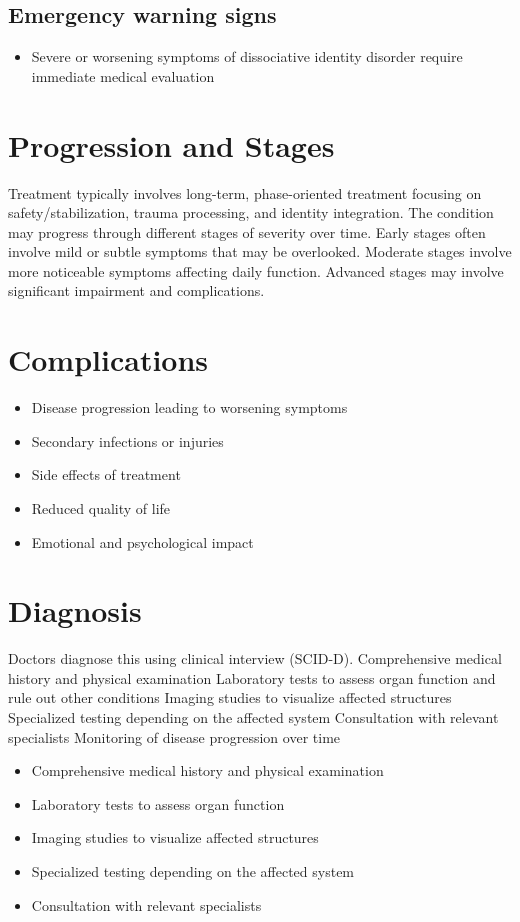 \subsection{Emergency warning signs}
\begin{itemize}[noitemsep]
  \item Severe or worsening symptoms of dissociative identity disorder require immediate medical evaluation
\end{itemize}
\section{Progression and Stages}
Treatment typically involves long-term, phase-oriented treatment focusing on safety/stabilization, trauma processing, and identity integration. The condition may progress through different stages of severity over time. Early stages often involve mild or subtle symptoms that may be overlooked. Moderate stages involve more noticeable symptoms affecting daily function. Advanced stages may involve significant impairment and complications.
\section{Complications}
\begin{itemize}[noitemsep]
  \item Disease progression leading to worsening symptoms
  \item Secondary infections or injuries
  \item Side effects of treatment
  \item Reduced quality of life
  \item Emotional and psychological impact
\end{itemize}
\section{Diagnosis}
Doctors diagnose this using clinical interview (SCID-D). Comprehensive medical history and physical examination Laboratory tests to assess organ function and rule out other conditions Imaging studies to visualize affected structures Specialized testing depending on the affected system Consultation with relevant specialists Monitoring of disease progression over time

\begin{itemize}[noitemsep]
  \item Comprehensive medical history and physical examination
  \item Laboratory tests to assess organ function
  \item Imaging studies to visualize affected structures
  \item Specialized testing depending on the affected system
  \item Consultation with relevant specialists
\end{itemize}
